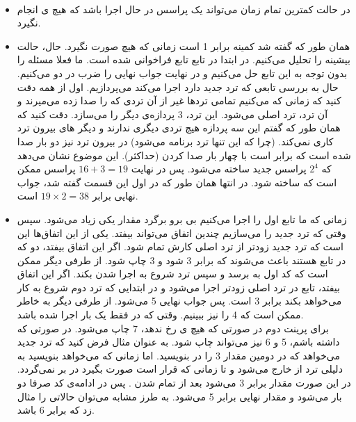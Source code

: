 \\
\noindent
\begin{itemize}
    \item در حالت کمترین تمام زمان می‌تواند یک پراسس در حال اجرا باشد که هیچ
    ی
    انجام نگیرد.
    \item همان طور که گفته شد کمینه برابر 1 است زمانی که هیچ  صورت نگیرد.
    حال، حالت بیشینه را تحلیل می‌کنیم. در ابتدا در تابع
    تابع
    فراخوانی شده است. ما فعلا مسئله را بدون توجه به این تابع حل می‌کنیم و در نهایت جواب نهایی را ضرب در
    دو می‌کنیم.
    حال به بررسی تابعی که ترد جدید دارد اجرا می‌کند می‌پردازیم. اول از همه دقت کنید که زمانی که
    می‌کنیم تمامی ترد‌ها غیر از آن تردی که
    را صدا زده می‌میرند و آن ترد، ترد اصلی می‌شود. این ترد، 3 پردازه‌ی دیگر را می‌سازد. دقت کنید که همان
    طور که گفتم این سه پردازه هیچ تردی دیگری ندارند و دیگر
    های
    بیرون ترد کاری نمی‌کند. (چرا که این تنها ترد برنامه می‌شود)
    در بیرون ترد نیز دو بار
    صدا شده است که برابر است با چهار بار صدا کردن
    (حداکثر).
    این موضوع نشان می‌دهد که
    $2^4$
    پراسس جدید ساخته می‌شود. پس در نهایت
    $16+3=19$
    پراسس ممکن است که ساخته شود. در انتها همان طور که در اول این قسمت گفته شد، جواب نهایی برابر
    $19 \times 2 = 38$
    است.
    \item زمانی که ما تابع
    اول را اجرا می‌کنیم بی برو برگرد مقدار
    یکی زیاد می‌شود. سپس وقتی که ترد جدید را می‌سازیم چندین اتفاق می‌تواند بیفتد.
    یکی از این اتفاق‌ها این است که ترد جدید زودتر از ترد اصلی کارش تمام شود. اگر این اتفاق بیفتد، دو
    که در تابع
    هستند باعث می‌شوند که
    برابر 3 شود و 3 چاپ شود.
    از طرفی دیگر ممکن است که کد اول به
    برسد و سپس ترد شروع به اجرا شدن بکند. اگر این اتفاق بیفتد، تابع
    در ترد اصلی زودتر اجرا می‌شود و
    در ابتدایی که ترد دوم شروع به کار می‌خواهد بکند برابر 3 است. پس جواب نهایی 5 می‌شود.
    از طرفی دیگر به خاطر
    ممکن است که 4 را نیز ببینیم. وقتی که در
    فقط یک بار
    اجرا شده باشد.
    \\
    برای پرینت دوم در صورتی که هیچ
    ی
    رخ ندهد، 7 چاپ می‌شود.
    در صورتی که
    داشته باشم، 5 و 6 نیز می‌تواند چاپ شود. به عنوان مثال فرض کنید که ترد جدید می‌خواهد که در دومین
    مقدار 3 را در
    بنویسید. اما زمانی که می‌خواهد بنویسید به دلیلی ترد از
    خارج می‌شود و تا زمانی که قرار است
    صورت بگیرد در
    بر نمی‌گردد. در این صورت مقدار
    برابر 3 می‌شود بعد از تمام شدن
    .
    پس در ادامه‌ی کد صرفا دو بار
    می‌شود و مقدار نهایی برابر 5 می‌شود. به طرز مشابه می‌توان حالاتی را مثال زد که
    برابر 6 باشد.
\end{itemize}